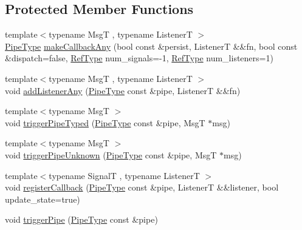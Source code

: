 \subsection*{Protected Member Functions}
\begin{DoxyCompactItemize}
\item 
{\footnotesize template$<$typename MsgT , typename ListenerT $>$ }\\\hyperlink{namespacevt_ac9852acda74d1896f48f406cd72c7bd3}{Pipe\+Type} \hyperlink{structvt_1_1pipe_1_1_pipe_manager_base_a6fec17887d5cae03c513088ccb4ce3db}{make\+Callback\+Any} (bool const \&persist, ListenerT \&\&fn, bool const \&dispatch=false, \hyperlink{namespacevt_a9b39ce9494bb04674d0d5b895a5aa50f}{Ref\+Type} num\+\_\+signals=-\/1, \hyperlink{namespacevt_a9b39ce9494bb04674d0d5b895a5aa50f}{Ref\+Type} num\+\_\+listeners=1)
\item 
{\footnotesize template$<$typename MsgT , typename ListenerT $>$ }\\void \hyperlink{structvt_1_1pipe_1_1_pipe_manager_base_aee28bc7a33e3a0b796aa8fcdd6f72bd9}{add\+Listener\+Any} (\hyperlink{namespacevt_ac9852acda74d1896f48f406cd72c7bd3}{Pipe\+Type} const \&pipe, ListenerT \&\&fn)
\item 
{\footnotesize template$<$typename MsgT $>$ }\\void \hyperlink{structvt_1_1pipe_1_1_pipe_manager_base_a34492ef027a92525ca5acc4e86b360ce}{trigger\+Pipe\+Typed} (\hyperlink{namespacevt_ac9852acda74d1896f48f406cd72c7bd3}{Pipe\+Type} const \&pipe, MsgT $\ast$msg)
\item 
{\footnotesize template$<$typename MsgT $>$ }\\void \hyperlink{structvt_1_1pipe_1_1_pipe_manager_base_ad21185d07e9c3a0206d3d5a791f668a3}{trigger\+Pipe\+Unknown} (\hyperlink{namespacevt_ac9852acda74d1896f48f406cd72c7bd3}{Pipe\+Type} const \&pipe, MsgT $\ast$msg)
\item 
{\footnotesize template$<$typename SignalT , typename ListenerT $>$ }\\void \hyperlink{structvt_1_1pipe_1_1_pipe_manager_base_a27f1aea903f8e05655eb84ae1474c729}{register\+Callback} (\hyperlink{namespacevt_ac9852acda74d1896f48f406cd72c7bd3}{Pipe\+Type} const \&pipe, ListenerT \&\&listener, bool update\+\_\+state=true)
\item 
void \hyperlink{structvt_1_1pipe_1_1_pipe_manager_base_a32f82a02196fe42e98ae3b628b73ae6d}{trigger\+Pipe} (\hyperlink{namespacevt_ac9852acda74d1896f48f406cd72c7bd3}{Pipe\+Type} const \&pipe)
\item 

\end{DoxyCompactItemize}
